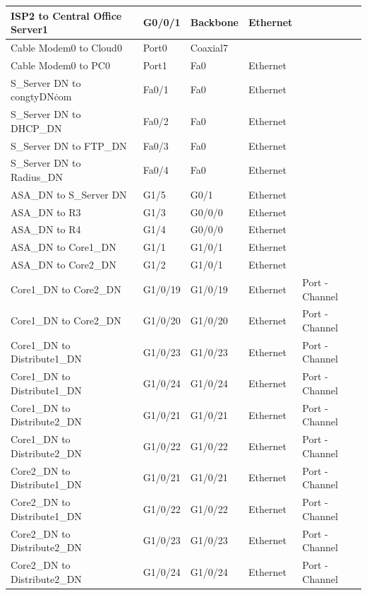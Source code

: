 \documentclass[12pt,a4paper]{report}
\begin{document}
\begin{center}
\begin{longtable}{|p{}|p{}|p{}|p{}|p{}|}
\hline  ISP2  to  Central Office Server1  &  G0/0/1  &  Backbone  &  Ethernet  &   \\
\hline  Cable Modem0  to  Cloud0  &  Port0  &  Coaxial7  &    &   \\
\hline  Cable Modem0  to  PC0  &  Port1  &  Fa0  &  Ethernet  &   \\
\hline  S\_Server DN  to  congtyDN\.com  &  Fa0/1  &  Fa0  &  Ethernet  &   \\
\hline  S\_Server DN  to  DHCP\_DN  &  Fa0/2  &  Fa0  &  Ethernet  &   \\
\hline  S\_Server DN  to  FTP\_DN  &  Fa0/3  &  Fa0  &  Ethernet  &   \\
\hline  S\_Server DN  to  Radius\_DN  &  Fa0/4  &  Fa0  &  Ethernet  &   \\
\hline  ASA\_DN  to  S\_Server DN  &  G1/5  &  G0/1  &  Ethernet  &   \\
\hline  ASA\_DN  to  R3  &  G1/3  &  G0/0/0  &  Ethernet  &   \\
\hline  ASA\_DN  to  R4  &  G1/4  &  G0/0/0  &  Ethernet  &   \\
\hline  ASA\_DN  to  Core1\_DN  &  G1/1  &  G1/0/1  &  Ethernet  &   \\
\hline  ASA\_DN  to  Core2\_DN  &  G1/2  &  G1/0/1  &  Ethernet  &   \\
\hline  Core1\_DN  to  Core2\_DN  &  G1/0/19  &  G1/0/19  &  Ethernet  &  Port - Channel \\
\hline  Core1\_DN  to  Core2\_DN  &  G1/0/20  &  G1/0/20  &  Ethernet  &  Port - Channel \\
\hline  Core1\_DN  to  Distribute1\_DN  &  G1/0/23  &  G1/0/23  &  Ethernet  &  Port - Channel \\
\hline  Core1\_DN  to  Distribute1\_DN  &  G1/0/24  &  G1/0/24  &  Ethernet  &  Port - Channel \\
\hline  Core1\_DN  to  Distribute2\_DN  &  G1/0/21  &  G1/0/21  &  Ethernet  &  Port - Channel \\
\hline  Core1\_DN  to  Distribute2\_DN  &  G1/0/22  &  G1/0/22  &  Ethernet  &  Port - Channel \\
\hline  Core2\_DN  to  Distribute1\_DN  &  G1/0/21  &  G1/0/21  &  Ethernet  &  Port - Channel \\
\hline  Core2\_DN  to  Distribute1\_DN  &  G1/0/22  &  G1/0/22  &  Ethernet  &  Port - Channel \\
\hline  Core2\_DN  to  Distribute2\_DN  &  G1/0/23  &  G1/0/23  &  Ethernet  &  Port - Channel \\
\hline  Core2\_DN  to  Distribute2\_DN  &  G1/0/24  &  G1/0/24  &  Ethernet  &  Port - Channel \\

\end{longtable}
\end{center}
\end{document}
